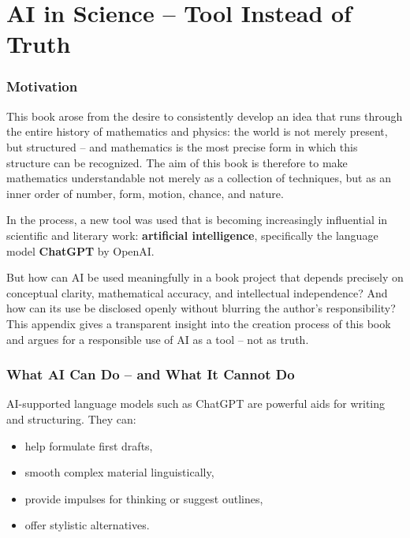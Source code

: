 \cleardoublepage

\chapter{AI in Science -- Tool Instead of Truth}
\label{anhangC:ki}

\subsection*{Motivation}

This book arose from the desire to consistently develop an idea
that runs through the entire history of mathematics and physics:
the world is not merely present, but structured --
and mathematics is the most precise form
in which this structure can be recognized.
The aim of this book is therefore
to make mathematics understandable not merely as a collection of techniques,
but as an inner order of number, form, motion, chance, and nature.

In the process, a new tool was used
that is becoming increasingly influential in scientific and literary work:
\textbf{artificial intelligence},
specifically the language model \textbf{ChatGPT} by OpenAI.

But how can AI be used meaningfully in a book project
that depends precisely on conceptual clarity,
mathematical accuracy,
and intellectual independence?
And how can its use be disclosed openly
without blurring the author's responsibility?
This appendix gives a transparent insight
into the creation process of this book
and argues for a responsible use of AI as a tool --
not as truth.

\subsection*{What AI Can Do -- and What It Cannot Do}

AI-supported language models such as ChatGPT are powerful aids
for writing and structuring.
They can:

\begin{itemize}
	\item help formulate first drafts,
	\item smooth complex material linguistically,
	\item provide impulses for thinking or suggest outlines,
	\item offer stylistic alternatives.
\end{itemize}

